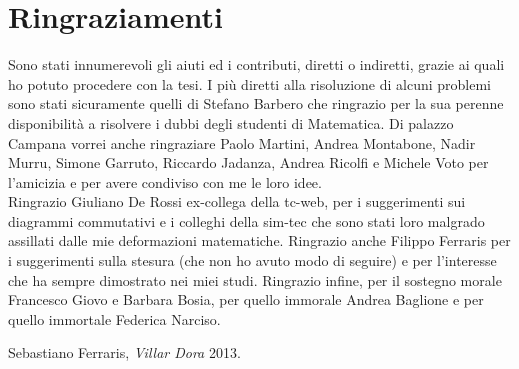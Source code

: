 \section*{Ringraziamenti}
Sono stati innumerevoli gli aiuti ed i contributi, diretti o indiretti, grazie ai quali ho potuto procedere con la tesi. I più diretti alla risoluzione di alcuni problemi sono stati sicuramente quelli di Stefano Barbero che ringrazio per la sua perenne disponibilità a risolvere i dubbi degli studenti di Matematica. Di palazzo Campana vorrei anche ringraziare Paolo Martini, Andrea Montabone, Nadir Murru, Simone Garruto, Riccardo Jadanza, Andrea Ricolfi e Michele Voto per l'amicizia e per avere condiviso con me le loro idee. \\
Ringrazio Giuliano De Rossi ex-collega della tc-web, per i suggerimenti sui diagrammi commutativi e i colleghi della sim-tec che sono stati loro malgrado assillati dalle mie deformazioni matematiche. Ringrazio anche Filippo Ferraris per i suggerimenti sulla stesura (che non ho avuto modo di seguire) e per l'interesse che ha sempre dimostrato nei miei studi.
Ringrazio infine, per il sostegno morale Francesco Giovo e Barbara Bosia, per quello immorale Andrea Baglione e per quello immortale Federica Narciso.\\


\begin{flushright}
\vspace*{0.5cm}

Sebastiano Ferraris, \emph{Villar Dora} 2013.
\end{flushright}
